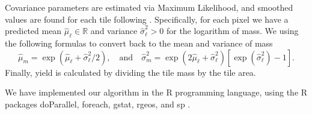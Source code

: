 Covariance parameters are estimated via Maximum Likelihood, and
smoothed values are found for each tile following \cite{Cressie1993}.
Specifically, for each pixel we have a predicted mean
$\hat\mu_{\ell} \in \mathbb{R}$ and variance
$\hat\sigma^2_{\ell} > 0$ for the logarithm of mass.  We using the
following formulas to convert back to the mean and variance of mass
\[ \hat{\mu}_{m} = \exp\left(\hat{\mu}_{\ell} +
\hat{\sigma}^2_{\ell}/2\right), \quad\mbox{and}\quad
\hat{\sigma}^2_{m} = \exp\left(2 \hat{\mu}_{\ell} +
\hat{\sigma}^2_{\ell}\right)
\left[\exp\left(\hat{\sigma}^2_{\ell}\right) - 1\right].
 \] Finally, yield is calculated by dividing the tile mass by the tile
area.

We have implemented our algorithm in the R programming language, using
the R packages doParallel, foreach, gstat, rgeos, and sp
\citep{Pebesma2004, Pebesma2005, Bivand2013, Graeler2016,
  Microsoft2017, Corporation2018, RCT2019, Bivand2019}.

